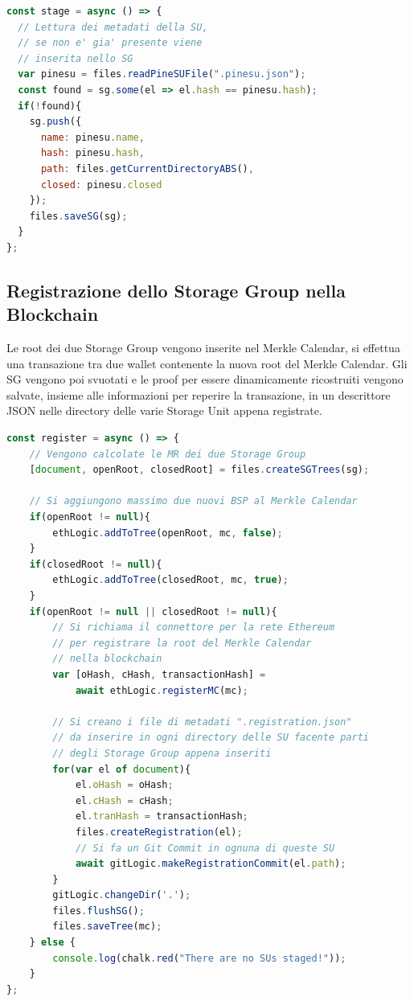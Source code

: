 \begin{lstlisting}[language=JavaScript]
const stage = async () => {
  // Lettura dei metadati della SU,
  // se non e' gia' presente viene
  // inserita nello SG
  var pinesu = files.readPineSUFile(".pinesu.json");
  const found = sg.some(el => el.hash == pinesu.hash);
  if(!found){
    sg.push({
      name: pinesu.name,
      hash: pinesu.hash,
      path: files.getCurrentDirectoryABS(),
      closed: pinesu.closed
    });
    files.saveSG(sg);
  }
};
\end{lstlisting}

\subsection{Registrazione dello Storage Group nella Blockchain}
Le root dei due Storage Group vengono inserite nel Merkle Calendar, si effettua una transazione tra due wallet contenente la nuova root del Merkle Calendar.
Gli SG vengono poi svuotati e le proof per essere dinamicamente ricostruiti vengono salvate, insieme alle informazioni per reperire la transazione, in un descrittore JSON nelle directory delle varie Storage Unit appena registrate.

\newpage

\begin{lstlisting}[language=JavaScript]
const register = async () => {
    // Vengono calcolate le MR dei due Storage Group
    [document, openRoot, closedRoot] = files.createSGTrees(sg);
    
    // Si aggiungono massimo due nuovi BSP al Merkle Calendar
    if(openRoot != null){
        ethLogic.addToTree(openRoot, mc, false);
    }
    if(closedRoot != null){
        ethLogic.addToTree(closedRoot, mc, true);
    }
    if(openRoot != null || closedRoot != null){
        // Si richiama il connettore per la rete Ethereum
        // per registrare la root del Merkle Calendar
        // nella blockchain
        var [oHash, cHash, transactionHash] =
            await ethLogic.registerMC(mc);
    
        // Si creano i file di metadati ".registration.json"
        // da inserire in ogni directory delle SU facente parti
        // degli Storage Group appena inseriti
        for(var el of document){
            el.oHash = oHash;
            el.cHash = cHash;
            el.tranHash = transactionHash;
            files.createRegistration(el);
            // Si fa un Git Commit in ognuna di queste SU
            await gitLogic.makeRegistrationCommit(el.path);
        }
        gitLogic.changeDir('.');
        files.flushSG();
        files.saveTree(mc);
    } else {
        console.log(chalk.red("There are no SUs staged!"));
    }
};
\end{lstlisting}

